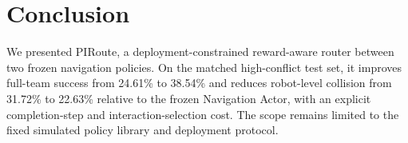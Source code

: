 \documentclass[letterpaper,10pt,conference]{ieeeconf}
\newcommand{\method}{PIRoute}
\begin{document}
\section{Conclusion}
We presented \method{}, a deployment-constrained reward-aware router between two frozen navigation policies. On the matched high-conflict test set, it improves full-team success from 24.61\% to 38.54\% and reduces robot-level collision from 31.72\% to 22.63\% relative to the frozen Navigation Actor, with an explicit completion-step and interaction-selection cost. The scope remains limited to the fixed simulated policy library and deployment protocol.



\end{document}
